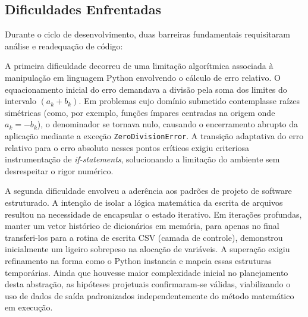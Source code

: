 
\subsection{Dificuldades Enfrentadas}
\label{subsec:dificuldades_bisseccao}

Durante o ciclo de desenvolvimento, duas barreiras fundamentais requisitaram análise e readequação de código:

A primeira dificuldade decorreu de uma limitação algorítmica associada à manipulação em linguagem Python envolvendo o cálculo de erro relativo. O equacionamento inicial do erro demandava a divisão pela soma dos limites do intervalo $(a_k + b_k)$. Em problemas cujo domínio submetido contemplasse raízes simétricas (como, por exemplo, funções ímpares centradas na origem onde $a_k = -b_k$), o denominador se tornava nulo, causando o encerramento abrupto da aplicação mediante a exceção \texttt{ZeroDivisionError}. A transição adaptativa do erro relativo para o erro absoluto nesses pontos críticos exigiu criteriosa instrumentação de \textit{if-statements}, solucionando a limitação do ambiente sem desrespeitar o rigor numérico.

A segunda dificuldade envolveu a aderência aos padrões de projeto de software estruturado. A intenção de isolar a lógica matemática da escrita de arquivos resultou na necessidade de encapsular o estado iterativo. Em iterações profundas, manter um vetor histórico de dicionários em memória, para apenas no final transferi-los para a rotina de escrita CSV (camada de controle), demonstrou inicialmente um ligeiro sobrepeso na alocação de variáveis. A superação exigiu refinamento na forma como o Python instancia e mapeia essas estruturas temporárias. Ainda que houvesse maior complexidade inicial no planejamento desta abstração, as hipóteses projetuais confirmaram-se válidas, viabilizando o uso de dados de saída padronizados independentemente do método matemático em execução.



